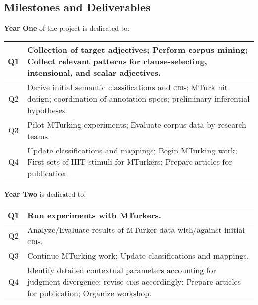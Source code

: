 \documentclass[10pt]{article}
\newcommand{\miniskip}{\vspace*{1mm}}
\begin{document}
\vspace {-2mm}
\vspace {-2mm}


\subsection{Milestones and Deliverables}
\vspace {-1mm}


{\bf Year One} of the project is dedicated to: 

\vspace{1mm}\noindent
{\small
\begin{tabularx}{470pt}{|c|X|}

\hline

Q1 & Collection of target adjectives; Perform corpus mining;  Collect relevant patterns for clause-selecting, intensional, and scalar adjectives. 
\\
\hline

Q2 & Derive initial semantic classifications and \textsc{cdi}s; MTurk hit design; coordination of annotation specs; preliminary inferential hypotheses.
\\

\hline

Q3 & Pilot MTurking experiments;  Evaluate corpus data by research teams.    \\

\hline

Q4 & Update classifications and mappings; Begin MTurking work; First sets of HIT stimuli for MTurkers; Prepare articles for publication.     \\

\hline

\end{tabularx}
}

\miniskip\noindent
{\bf Year Two} is dedicated to: 

\vspace{2mm}\noindent
{\small
\begin{tabularx}{470pt}{|c|X|}

\hline

Q1 	&  Run experiments with MTurkers. \\

\hline

Q2	& Analyze/Evaluate results of MTurker data with/against initial \textsc{cdi}s. \\

\hline

Q3	&  Continue MTurking work; Update classifications and mappings. \\

\hline

Q4	& Identify detailed contextual parameters accounting for judgment divergence; revise \textsc{cdi}s accordingly; Prepare articles for
     publication;  Organize workshop. \\
\hline

\end{tabularx}
}
\end{document}
